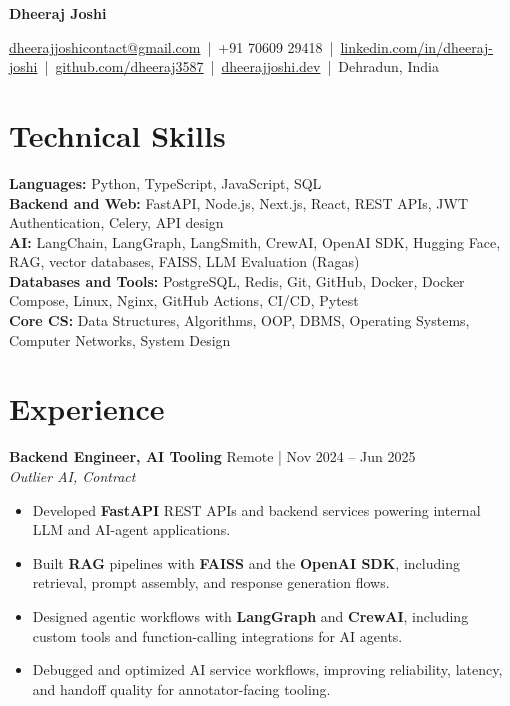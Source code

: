 \documentclass[a4paper,11pt]{article}
\begin{document}
\begin{center}
  {\fontsize{19}{22}\selectfont\textbf{Dheeraj Joshi}\par}
  \vspace{3pt}
  {\small
    \href{mailto:dheerajjoshicontact@gmail.com}{\color{linkcolor}dheerajjoshicontact@gmail.com}
    \,|\, +91 70609 29418
    \,|\, \href{https://linkedin.com/in/dheeraj-joshi}{\color{linkcolor}linkedin.com/in/dheeraj-joshi}
    \,|\, \href{https://github.com/dheeraj3587}{\color{linkcolor}github.com/dheeraj3587}
    \,|\, \href{https://dheerajjoshi.dev}{\color{linkcolor}dheerajjoshi.dev}
    \,|\, Dehradun, India
  }
\end{center}

\section{Technical Skills}
{\small
\textbf{Languages:} Python, TypeScript, JavaScript, SQL \\
\textbf{Backend and Web:} FastAPI, Node.js, Next.js, React, REST APIs, JWT Authentication, Celery, API design \\
\textbf{AI:} LangChain, LangGraph, LangSmith, CrewAI, OpenAI SDK, Hugging Face, RAG, vector databases, FAISS, LLM Evaluation (Ragas) \\
\textbf{Databases and Tools:} PostgreSQL, Redis, Git, GitHub, Docker, Docker Compose, Linux, Nginx, GitHub Actions, CI/CD, Pytest \\
\textbf{Core CS:} Data Structures, Algorithms, OOP, DBMS, Operating Systems, Computer Networks, System Design
}

\section{Experience}
{\small
\textbf{Backend Engineer, AI Tooling} \hfill \textcolor{subtext}{Remote | Nov 2024 -- Jun 2025}\\
\textit{Outlier AI, Contract}
\begin{itemize}
  \item Developed \textbf{FastAPI} REST APIs and backend services powering internal LLM and AI-agent applications.
  \item Built \textbf{RAG} pipelines with \textbf{FAISS} and the \textbf{OpenAI SDK}, including retrieval, prompt assembly, and response generation flows.
  \item Designed agentic workflows with \textbf{LangGraph} and \textbf{CrewAI}, including custom tools and function-calling integrations for AI agents.
  \item Debugged and optimized AI service workflows, improving reliability, latency, and handoff quality for annotator-facing tooling.
\end{itemize}
}
\end{document}

